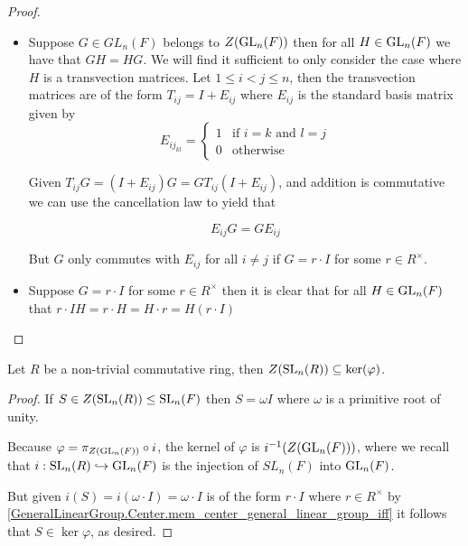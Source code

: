     \begin{proof}
        \begin{itemize}
        \item Suppose $G \in GL_n(F)$ belongs to $Z(\operatorname{GL}_n(F))$ then for all $H \in \operatorname{GL}_n(F)$ we have that $G H = H G$. We will find it sufficient to only consider the case where $H$ is a transvection matrices.
        Let $1 \leq i < j \leq n$, then the transvection matrices are of the form $T_{ij} = I + E_{ij}$ where $E_{ij}$ is the standard basis matrix given by
        \[
        E_{{ij}_{kl}} = \begin{cases}
        1 & \text{if $i = k$ and $l = j$}\\
        0 & \text{otherwise}
        \end{cases}
        \] 
    
        Given $T_{ij} G = (I + E_{ij}) G = G T_{ij} (I + E_{ij})$, and addition is commutative we can use the cancellation law to yield that
        
        \[
        E_{ij} G = G E_{ij}
        \]
    
        But $G$ only commutes with $E_{ij}$ for all $i \neq j$ if $G = r \cdot I$ for some $r \in R^\times$.
        
        \item Suppose $G = r \cdot I$ for some $r \in R^\times$ then it is clear that for all $H \in \operatorname{GL}_n(F)$ that $r \cdot I  H = r \cdot H = H \cdot r = H (r \cdot I)$
        \end{itemize}
    \end{proof}

\begin{lemma}
\label{center_SL_le_ker}
\leanok
Let $R$ be a non-trivial commutative ring, then $Z(\operatorname{SL}_n(R)) \subseteq \ker (\varphi)$.
\end{lemma}

\begin{proof}
If $S \in Z(\operatorname{SL}_n(R)) \leq \operatorname{SL}_n(F)$ then $S = \omega I$ where $\omega$ is a primitive root of unity.

Because $\varphi = \pi_{Z(\operatorname{GL}_n(F))} \circ i$, the kernel of $\varphi$ is $i^{-1}(Z(\operatorname{GL}_n(F)))$, where we recall that $i : \operatorname{SL}_n(R) \hookrightarrow \operatorname{GL}_n(F)$ is the injection of $SL_n(F)$ into $\operatorname{GL}_n(F)$.

But given $i(S) = i(\omega \cdot I) = \omega \cdot I$ is of the form $r \cdot I$ where $r \in R^\times$ by \ref{GeneralLinearGroup.Center.mem_center_general_linear_group_iff} it follows that $S \in \ker \varphi$, as desired.
\end{proof}


